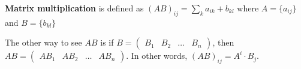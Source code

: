\begin{definition}
	\textbf{Matrix multiplication} is defined as \( (AB)_{ij} = \sum_{k} a_{ik} + b_{kl}\) where \( A=\{a_{ij}\}   \) and \( B = \{b_{kl}\}   \)
\end{definition}

The other way to see \( AB \) is if \( B=\begin{pmatrix}
	B_{1} & B_{2} & \ldots & B_n
\end{pmatrix} \), then \(	AB=\begin{pmatrix}
	AB_{1}&AB_{2}&\ldots &AB_n
\end{pmatrix} \). In other words, \((AB)_{ij} = A^i \cdot B_j \).

